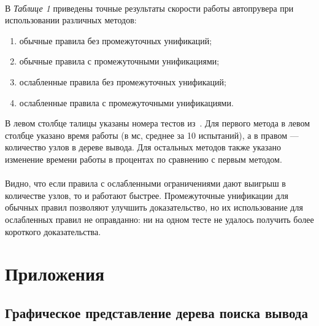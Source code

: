 \documentclass{cw1}
\begin{document}
\paragraph{}
В \textit{Таблице 1} приведены точные результаты скорости работы автопрувера при использовании
различных методов:
 \begin{enumerate}
  \item обычные правила без промежуточных унификаций;
  \item обычные правила с промежуточными унификациями;
  \item ослабленные правила без промежуточных унификаций;
  \item ослабленные правила с промежуточными унификациями.
 \end{enumerate}
В левом столбце талицы указаны номера тестов из~\cite{tests}.
Для первого метода в левом столбце указано время работы (в мс, среднее за 10 испытаний), а в
правом --- количество узлов в дереве вывода. Для остальных методов также указано изменение времени
работы в процентах по сравнению с первым методом.
\paragraph{}
Видно, что если правила с ослабленными ограничениями дают выигрыш в количестве узлов, то и работают
быстрее. Промежуточные унификации для обычных правил позволяют улучшить доказательство, но
их использование для ослабленных правил не оправданно: ни на одном тесте не удалось получить
более короткого доказательства.

\section{Приложения}
\subsection{Графическое представление дерева поиска вывода}
\end{document}
